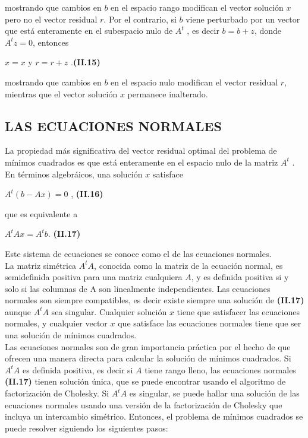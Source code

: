 \documentclass[twocolumn,twoside]{article}
\begin{document}
mostrando que cambios en $b$ en el espacio rango modifican el vector soluci\'on $x$ pero
no el vector residual $r$. Por el contrario, si $b$ viene perturbado por un vector que est\'a
enteramente en el subespacio nulo de $A^t$ , es decir $b = b + z$, donde $A^t z = 0$, entonces
\begin{center}
  $x = x$ y $r = r + z$ .\hspace{1.5cm}\textbf{(II.15)}
\end{center}
mostrando que cambios en $b$ en el espacio nulo modifican el vector residual $r$, mientras
que el vector soluci\'on $x$ permanece inalterado.

\subsection{LAS ECUACIONES NORMALES}
La propiedad m\'as significativa del vector residual optimal del problema de m\'inimos
cuadrados es que est\'a enteramente en el espacio nulo de la matriz $A^t$ . En t\'erminos
algebr\'aicos, una soluci\'on $x$ satisface
\begin{center}
 $A^t (b - A x) = 0$ ,\hspace{2cm} \textbf{(II.16)}
\end{center}
que es equivalente a
\begin{center}
 $ A^t A x = A^t b $. \hspace{2cm} \textbf{(II.17)}
\end{center}

Este sistema de ecuaciones se conoce como el de las ecuaciones normales.\\
La matriz sim\'etrica $A^t A$, conocida como la matriz de la ecuaci\'on normal, es
semidefinida positiva para una matriz cualquiera $A$, y es definida positiva si y solo si
las columnas de A son linealmente independientes. Las ecuaciones normales son siempre
compatibles, es decir existe siempre una soluci\'on de \textbf{(II.17)} aunque $A^t A$ sea singular.
Cualquier soluci\'on $x$ tiene que satisfacer las ecuaciones normales, y cualquier vector $x$
que satisface las ecuaciones normales tiene que ser una soluci\'on de m\'inimos cuadrados.\\
Las ecuaciones normales son de gran importancia pr\'actica por el hecho de que ofrecen
una manera directa para calcular la soluci\'on de m\'inimos cuadrados. Si $A^t A$ es definida
positiva, es decir si $A$ tiene rango lleno, las ecuaciones normales \textbf{(II.17)} tienen soluci\'on
\'unica, que se puede encontrar usando el algoritmo de factorizaci\'on de Cholesky. Si $A^t A$
es singular, se puede hallar una soluci\'on de las ecuaciones normales usando una versi\'on de
la factorizaci\'on de Cholesky que incluya un intercambio sim\'etrico. Entonces, el problema
de m\'inimos cuadrados se puede resolver siguiendo los siguientes pasos:
\end{document}
